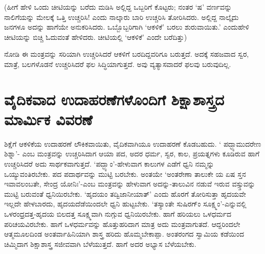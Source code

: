 (ಹೀಗೆ ಹೇಳಿ ಒಂದು ಚೀಟಿಯನ್ನು ಬರೆದು ಮಡಿಸಿ ಅಲ್ಲಿದ್ದ ಒಬ್ಬರಿಗೆ ಕೊಟ್ಟರು; ನಂತರ `ಷ' ವರ್ಣವನ್ನು ನಾಲಿಗೆಯನ್ನು ಮೇಲಕ್ಕೆ  ಒತ್ತಿ ಉಚ್ಚರಿಸಿ! ಎಂದು ನಾಲ್ಕಾರು ಬಾರಿ ಉಚ್ಚರಿಸಿ ತೋರಿಸಿದರು. ಅಲ್ಲಿದ್ದ ನಾಲ್ಕೈದು ಜನಗಳೂ ಅದನ್ನು ಹಾಗೆಯೇ ಅನುಕರಿಸಿದರು. ಒಬ್ಬೊಬ್ಬರಿಗಾಗಿ `ಆಕಳಿಕೆ' ಬರಲು ಶುರುವಾಯಿತು.' ಎಂದುಹೇಳಿ ಚೀಟಿಯನ್ನು ಬಿಚ್ಚಿ ಓದುವಂತೆ ಹೇಳಿದರು. ಚೀಟಿಯಲ್ಲಿ `ಆಕಳಿಕೆ' ಎಂದೇ ಬರೆದಿತ್ತು)

ನೋಡಿ ಈ ಮಂತ್ರವನ್ನು ಸರಿಯಾಗಿ ಉಚ್ಚರಿಸಿದರೆ ಆಕಳಿಗೆ ಬರದಿದ್ದವರಿಗೂ ಬರುತ್ತದೆ. ಅದಕ್ಕೆ ಸಹಜವಾದ ಸ್ವರ, ಮಾತ್ರೆ, ಬಲಗಳೊಡನೆ ಉಚ್ಚರಿಸಿದರೆ ಫಲ ಸಿದ್ಧಿಯಾಗುತ್ತದೆ. ಅವು ವ್ಯತ್ಯಾಸವಾದರೆ ಫಲವು ಬರುವುದಿಲ್ಲ.

\section*{ವೈದಿಕವಾದ ಉದಾಹರಣೆಗಳೊಂದಿಗೆ ಶಿಕ್ಷಾಶಾಸ್ತ್ರದ ಮಾರ್ಮಿಕ ವಿವರಣೆ}

ಶಿಕ್ಷೆಗೆ ಆಕಳಿಕೆಯ ಉದಾಹರಣೆ ಲೌಕಿಕವಾಯಿತು, ವೈದಿಕವಾಗಿಯೂ ಉದಾಹರಣೆ ಕೊಡಬಹುದು. ` ಪದ್ಭ್ಯಾಮುದರೇಣ ಶಿಶ್ನಾ'- ಎಂಬ ಮಂತ್ರವನ್ನು ಉಚ್ಚರಿಸಿದಾಗ ಆಯಾ ಪದ, ಅದರ ಧರ್ಮ, ಸ್ವರ, ಕಾಲ, ಪ್ರಯತ್ನಗಳು ಕೂಡಿರುವ ಹಾಗೆ ಉಚ್ಚರಿಸಿದರೆ ಅದು ಸಾರ್ಥಕವಾಗುತ್ತದೆ. `ಪದ್ಭ್ಯಾಂ'-ಹೇಳುವಾಗ ಕಾಲುಗಳ ಎಡೆಗೆ ಧ್ವನಿ ನಮ್ಮನ್ನು ಒಯ್ಯುವಂತಿರಬೇಕು. ಪದ ಪದಾರ್ಥವನ್ನು ಮುಟ್ಟಿ ಬರಬೇಕು. ಅಂತಯೇ `ಅಂತರೇಣಾ ತಾಲುಕೇ ಯ ಏಷ ಸ್ತನ ಇವಾವಲಂಬತೇ, ಸೇಂದ್ರ ಯೋನಿಃ'-ಎಂಬ ಮಂತ್ರವನ್ನು ಹೇಳುವಾಗ ಅದನ್ನು-ತಾಲುವಿನ ನಡುವೆ ಇರುವ ವಸ್ಸ್ತುವನ್ನು ಮುಟ್ಟಿ ಬರುವಂತೆ ಧ್ವನಿಯಿರಬೇಕು. `ಹೃದಯಂ ತದ್ವಿಜಾನೀಯಾತ್' ಎಂದು ಹೊರಗೆ ತೋರಿಸುತ್ತಾ ಹೃದಯವೇ ಇಲ್ಲದೇ ಹೇಳಬಾರದು, ಹೃದಯದೆಡೆಯಿಂದಲೇ ಧ್ವನಿ ಹುಟ್ಟಬೇಕು. `ತಸ್ಯಾಂತೇ ಸುಷಿರಗ್ಂ ಸೂಕ್ಷ್ಮಂ'-ಎನ್ನುವಲ್ಲಿ ಒಳರಂಧ್ರದತ್ತ-ಹೃದಯ ಬಿಲದತ್ತ ಸೂಕ್ಷ್ಮವಾಗಿ ನುಗ್ಗುವ ಧ್ವನಿಯಿರಬೇಕು. ಹಾಗೆ ಹರಿಯಲು ಒಳಧರ್ಮದ ಪರಿಚಯವಿರಬೇಕು. ಹಾಗೆ ಒಳಧರ್ಮವನ್ನು ಹೊತ್ತುಹರಿದಾಗ ಮಾತ್ರ ಅದು ಮಂತ್ರವಾಗುತದೆ. ಆದ್ದರಿಂದಲೇ ಆತ್ಮಮೂಲದಿಂಡ ಅಂತರ್ವಾಹಿನಿಯಾಗಿ ಶಾಸ್ತ್ರ ಹರಿದು ಹೊಮ್ಮಬೇಕಾಪ್ಪಾ. ಅಂತರಂಗದ ಸ್ವಾಮಿಯ ಕಡೆಯಿಂದ ಚಿಮ್ಮಿದಾಗ ಶಿಕ್ಷಾಶಾಸ್ತ್ರ ಸಜೀವವಾಗಿ ಬೆಳೆಯುತ್ತದೆ. ಹಾಗೆ ಅದರ ಅಭ್ಯಾಸ ಬೆಳೆಯಬೇಕು.

\section*{}
\section*{}
\section*{}
\section*{}
\section*{}

